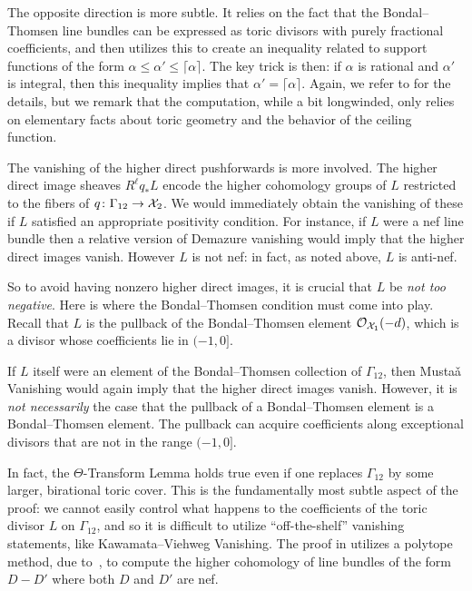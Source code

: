 \documentclass{amsart}
\begin{document}
The opposite direction is more subtle.  It relies on the fact that the Bondal--Thomsen line bundles can be expressed as toric divisors with purely fractional coefficients, and then utilizes this to create an inequality related to support functions of the form $\alpha \leq \alpha' \leq \lceil \alpha \rceil$.  The key trick is then:  if $\alpha$ is rational and $\alpha'$ is integral, then this inequality implies that $\alpha' = \lceil \alpha \rceil$.  Again, we refer to \cite[Lemma~4.14]{BBB+24} for the details, but we remark that the computation, while a bit longwinded, only relies on elementary facts about toric geometry and the behavior of the ceiling function.

The vanishing of the higher direct pushforwards is more involved.
The higher direct image sheaves $R^\ell q_*L$ encode the higher cohomology groups of $L$ restricted to the fibers of $q\colon \Gamma_{12} \to \mathcal X_2$.   We would immediately obtain the vanishing of these if $L$ satisfied an appropriate positivity condition.  For instance, if $L$ were a nef line bundle then a relative version of Demazure vanishing would imply that the higher direct images vanish.  However $L$ is not nef:  in fact, as noted above, $L$ is anti-nef.

So to avoid having nonzero higher direct images, it is crucial that $L$ be {\em not too negative}.   Here is where the Bondal--Thomsen condition must come into play.  Recall that $L$ is the pullback of the Bondal--Thomsen element ${\mathcal O}_{\mathcal X_1}(-d)$, which is a divisor whose coefficients lie in $(-1,0]$.

If $L$ itself were an element of the Bondal--Thomsen collection of $\Gamma_{12}$, then Musta\v{a} Vanishing would again imply that the higher direct images vanish.  However, it is {\em not necessarily} the case that the pullback of a Bondal--Thomsen element is a Bondal--Thomsen element.  The pullback can acquire coefficients along exceptional divisors that are not in the range $(-1,0]$.

In fact, the $\Theta$-Transform Lemma holds true even if one replaces $\Gamma_{12}$ by some larger, birational toric cover.  This is the fundamentally most subtle aspect of the proof: we cannot easily control what happens to the coefficients of the toric divisor $L$ on $\Gamma_{12}$, and so it is difficult to utilize ``off-the-shelf'' vanishing statements, like Kawamata--Viehweg Vanishing.  The proof in \cite[\S4.3]{BBB+24} utilizes a polytope method, due to~\cite[Theorem~3.6]{ABK+20}, to compute the higher cohomology of line bundles of the form $D-D'$ where both $D$ and $D'$ are nef.
\end{document}
